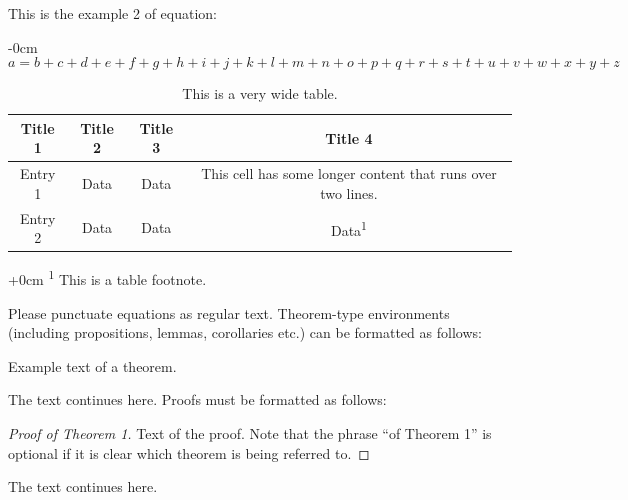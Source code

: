 \documentclass[journal,article,submit,pdftex,moreauthors]{Definitions/mdpi}
\begin{document}
\begin{itemize}
This is the example 2 of equation:
\begin{adjustwidth}{-\extralength}{0cm}
\begin{equation}
a = b + c + d + e + f + g + h + i + j + k + l + m + n + o + p + q + r + s + t + u + v + w + x + y + z
\end{equation}
\end{adjustwidth}

\startlandscape
\begin{table}[H] %
\caption{This is a very wide table.\label{tab3}}
	\begin{tabularx}{\textwidth}{CCCC}
		\toprule
		\textbf{Title 1}	& \textbf{Title 2}	& \textbf{Title 3}	& \textbf{Title 4}\\
		\midrule
		Entry 1		& Data			& Data			& This cell has some longer content that runs over two lines.\\
		Entry 2		& Data			& Data			& Data\textsuperscript{1}\\
		\bottomrule
	\end{tabularx}
	\begin{adjustwidth}{+\extralength}{0cm}
		\noindent\footnotesize{\textsuperscript{1} This is a table footnote.}
	\end{adjustwidth}
\end{table}
\finishlandscape


Please punctuate equations as regular text. Theorem-type environments (including propositions, 
lemmas, corollaries etc.) can be formatted as follows:
\begin{Theorem}
Example text of a theorem.
\end{Theorem}

The text continues here. Proofs must be formatted as follows:

\begin{proof}[Proof of Theorem 1]
Text of the proof. Note that the phrase ``of Theorem 1'' is optional if it is clear 
which theorem is being referred to.
\end{proof}
The text continues here.


\end{itemize}
\end{document}
